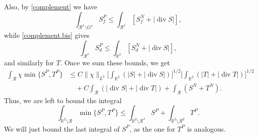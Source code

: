 \documentclass[11pt,a4paper]{amsart}
\newcommand{\R}{\mathbb{R}}
\theoremstyle{definition}
\DeclareMathOperator{\dive}{div}
\begin{document}
Also, by \cref{complement} we have
$$\int_{\mathcal{R}^x\setminus G^x}S_f^P
\le \int_{\mathcal{R}^x}[S_f^N + \lvert\operatorname{div}S\rvert],$$
while \cref{complement.bis} gives
$$\int_{\mathcal{R}^x}S_d^P
\le \int_{\R^2}[S_d^N + \lvert\operatorname{div}S\rvert],$$
and similarly for $T$. Once we sum these bounds, we get
\begin{align*}
    \int_{\mathcal{R}} \chi \min\{S^P,T^P\}
		&\le C\|\chi\|_{L^2}\Big[\int_{\R^2}(|S|+\lvert \dive S\rvert)\Big]^{1/2}\Big[\int_{\R^2}(|T|+\lvert \dive T\rvert)\Big]^{1/2} \\
		&\quad+C\int_{\mathcal{R}} (\lvert \dive S\rvert+\lvert \dive T\rvert)
        +\int_{\mathcal{R}}(S^N+T^N).
\end{align*}
Thus, we are left to bound the integral
$$\int_{\R^2\setminus\mathcal{R}}\min\{S^P,T^P\}
\le\int_{\R^2\setminus\mathcal{R}^x}S^P+\int_{\R^2\setminus\mathcal{R}^y}T^P.$$
We will just bound the last integral of $S^P$, as the one for $T^P$ is analogous.
\end{document}
